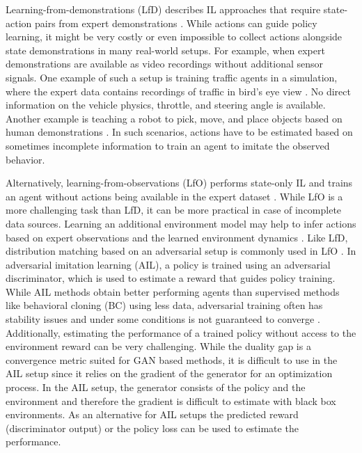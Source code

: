 \documentclass{article}
\begin{document}
Learning-from-demonstrations (LfD) describes IL approaches that require state-action pairs from expert demonstrations \cite{GAIL}. While actions can guide policy learning, it might be very costly or even impossible to collect actions alongside state demonstrations in many real-world setups. For example, when expert demonstrations are available as video recordings without additional sensor signals. One example of such a setup is training traffic agents in a simulation, where the expert data contains recordings of traffic in bird's eye view \cite{kuefler2017imitating}. No direct information on the vehicle physics, throttle, and steering angle is available. Another example is teaching a robot to pick, move, and place objects based on human demonstrations \cite{osa2018an}. In such scenarios, actions have to be estimated based on sometimes incomplete information to train an agent to imitate the observed behavior.  

Alternatively, learning-from-observations (LfO) performs state-only IL and trains an agent without actions being available in the expert dataset \cite{torabi2019recent}. While LfO is a more challenging task than LfD, it can be more practical in case of incomplete data sources. Learning an additional environment model may help to infer actions based on expert observations and the learned environment dynamics \cite{torabi2018behavioral}. Like LfD, distribution matching based on an adversarial setup is commonly used in LfO \cite{torabi2018generative}. In adversarial imitation learning (AIL), a policy is trained using an adversarial discriminator, which is used to estimate a reward that guides policy training. While AIL methods obtain better performing agents than supervised methods like behavioral cloning (BC) using less data, adversarial training often has stability issues \cite{miyato2018spectral} and under some conditions is not guaranteed to converge \cite{Jin2020What}. 
Additionally, estimating the performance of a trained policy without access to the environment reward can be very challenging. While the duality gap \cite{grnarova2019a,Sidheekh2021OnDG} is a convergence metric suited for GAN based methods, it is difficult to use in the AIL setup since it relies on the gradient of the generator for an optimization process. In the AIL setup, the generator consists of the policy and the environment and therefore the gradient is difficult to estimate with black box environments. As an alternative for AIL setups the predicted reward (discriminator output) or the policy loss can be used to estimate the performance.  
\end{document}
